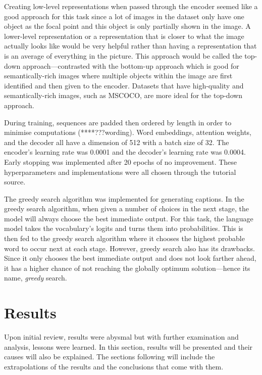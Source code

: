 \documentclass[11pt,a4paper]{article}
\begin{document}
Creating low-level representations when passed through the encoder seemed like a good approach for this task since a lot of images in the dataset only have one object as the focal point and this object is only partially shown in the image. A lower-level representation or a representation that is closer to what the image actually looks like would be very helpful rather than having a representation that is an average of everything in the picture. This approach would be called the top-down approach—contrasted with the bottom-up approach which is good for semantically-rich images where multiple objects within the image are first identified and then given to the encoder. \citep{Anderson-2017-bottomuptopdown} Datasets that have high-quality and semantically-rich images, such as MSCOCO, are more ideal for the top-down approach.

During training, sequences are padded then ordered by length in order to minimise computations (****???wording). Word embeddings, attention weights, and the decoder all have a dimension of 512 with a batch size of 32. The encoder’s learning rate was 0.0001 and the decoder’s learning rate was 0.0004. Early stopping was implemented after 20 epochs of no improvement. These hyperparameters and implementations were all chosen through the tutorial source.  

The greedy search algorithm was implemented for generating captions. In the greedy search algorithm, when given a number of choices in the next stage, the model will always choose the best immediate output. For this task, the language model takes the vocabulary’s logits and turns them into probabilities. This is then fed to the greedy search algorithm where it chooses the highest probable word to occur next at each stage. However, greedy search also has its drawbacks. Since it only chooses the best immediate output and does not look farther ahead, it has a higher chance of not reaching the globally optimum solution—hence its name, \emph{greedy} search.

\section{Results}
\label{sec:results}

Upon initial review, results were abysmal but with further examination and analysis, lessons were learned. In this section, results will be presented and their causes will also be explained. The sections following will include the extrapolations of the results and the conclusions that come with them. 
\end{document}
